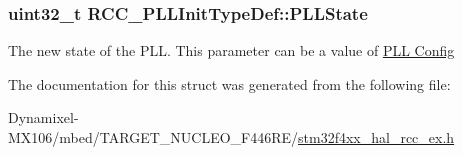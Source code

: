 \subsubsection[{\texorpdfstring{P\+L\+L\+State}{PLLState}}]{\setlength{\rightskip}{0pt plus 5cm}uint32\+\_\+t R\+C\+C\+\_\+\+P\+L\+L\+Init\+Type\+Def\+::\+P\+L\+L\+State}\hypertarget{struct_r_c_c___p_l_l_init_type_def_a6cbaf84f6566af15e6e4f97a339d5759}{}\label{struct_r_c_c___p_l_l_init_type_def_a6cbaf84f6566af15e6e4f97a339d5759}
The new state of the P\+LL. This parameter can be a value of \hyperlink{group___r_c_c___p_l_l___config}{P\+LL Config} 

The documentation for this struct was generated from the following file\+:\begin{DoxyCompactItemize}
\item 
Dynamixel-\/\+M\+X106/mbed/\+T\+A\+R\+G\+E\+T\+\_\+\+N\+U\+C\+L\+E\+O\+\_\+\+F446\+R\+E/\hyperlink{stm32f4xx__hal__rcc__ex_8h}{stm32f4xx\+\_\+hal\+\_\+rcc\+\_\+ex.\+h}\end{DoxyCompactItemize}
